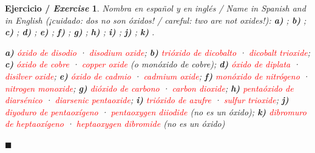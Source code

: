 \documentclass[12pt]{article}
\theoremstyle{mygreennumbox}
\newtheorem{ejercicioT}{Ejercicio / \textit{Exercise}}[section]
\newenvironment{exercise}{\begin{eBoxmygreen}\begin{ejercicioT}}{\hfill{\color{mygreen}\tiny\ensuremath{\blacksquare}}\end{ejercicioT}\end{eBoxmygreen}}
\newcommand{\en}[1]{\textit{#1}}
\begin{document}
\begin{exercise}
    Nombra en español y en inglés / \en{Name in Spanish and in English} (¡cuidado: dos no son óxidos! / \en{careful: two are not oxides!}): \textbf{a)} ; \textbf{b)} ; \textbf{c)} ; \textbf{d)} ; \textbf{e)} ; \textbf{f)} ; \textbf{g)} ; \textbf{h)} ; \textbf{i)} ; \textbf{j)} ; \textbf{k)} .
    \begin{solu}
        \textbf{a)} \textcolor{red}{óxido de disodio} · \textcolor{red}{\en{disodium oxide}}; \textbf{b)} \textcolor{red}{trióxido de dicobalto} · \textcolor{red}{\en{dicobalt trioxide}}; \textbf{c)} \textcolor{red}{óxido de cobre} · \textcolor{red}{\en{copper oxide}} (o monóxido de cobre); \textbf{d)} \textcolor{red}{óxido de diplata} · \textcolor{red}{\en{disilver oxide}}; \textbf{e)} \textcolor{red}{óxido de cadmio} · \textcolor{red}{\en{cadmium oxide}}; \textbf{f)} \textcolor{red}{monóxido de nitrógeno} · \textcolor{red}{\en{nitrogen monoxide}}; \textbf{g)} \textcolor{red}{dióxido de carbono} · \textcolor{red}{\en{carbon dioxide}}; \textbf{h)} \textcolor{red}{pentaóxido de diarsénico} · \textcolor{red}{\en{diarsenic pentaoxide}}; \textbf{i)} \textcolor{red}{trióxido de azufre} · \textcolor{red}{\en{sulfur trioxide}}; \textbf{j)} \textcolor{red}{diyoduro de pentaoxígeno} · \textcolor{red}{\en{pentaoxygen diiodide}} (no es un óxido); \textbf{k)} \textcolor{red}{dibromuro de heptaoxígeno} · \textcolor{red}{\en{heptaoxygen dibromide}} (no es un óxido)
    \end{solu}
\end{exercise}
\end{document}
